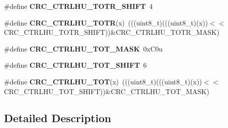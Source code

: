 \begin{DoxyCompactItemize}
\item 
\#define {\bfseries C\+R\+C\+\_\+\+C\+T\+R\+L\+H\+U\+\_\+\+T\+O\+T\+R\+\_\+\+S\+H\+I\+FT}~4\hypertarget{group__CRC__Register__Masks_ga991fefda83335d188d0cc82f1e64f43e}{}\label{group__CRC__Register__Masks_ga991fefda83335d188d0cc82f1e64f43e}

\item 
\#define {\bfseries C\+R\+C\+\_\+\+C\+T\+R\+L\+H\+U\+\_\+\+T\+O\+TR}(x)~(((uint8\+\_\+t)(((uint8\+\_\+t)(x))$<$$<$C\+R\+C\+\_\+\+C\+T\+R\+L\+H\+U\+\_\+\+T\+O\+T\+R\+\_\+\+S\+H\+I\+FT))\&C\+R\+C\+\_\+\+C\+T\+R\+L\+H\+U\+\_\+\+T\+O\+T\+R\+\_\+\+M\+A\+SK)\hypertarget{group__CRC__Register__Masks_ga93d5a2251369091d34c8cca12d716c2b}{}\label{group__CRC__Register__Masks_ga93d5a2251369091d34c8cca12d716c2b}

\item 
\#define {\bfseries C\+R\+C\+\_\+\+C\+T\+R\+L\+H\+U\+\_\+\+T\+O\+T\+\_\+\+M\+A\+SK}~0x\+C0u\hypertarget{group__CRC__Register__Masks_gac2999b1c162cd0860f76f002ead704ad}{}\label{group__CRC__Register__Masks_gac2999b1c162cd0860f76f002ead704ad}

\item 
\#define {\bfseries C\+R\+C\+\_\+\+C\+T\+R\+L\+H\+U\+\_\+\+T\+O\+T\+\_\+\+S\+H\+I\+FT}~6\hypertarget{group__CRC__Register__Masks_ga079a05fc69d357e3fadfb07de8abbeee}{}\label{group__CRC__Register__Masks_ga079a05fc69d357e3fadfb07de8abbeee}

\item 
\#define {\bfseries C\+R\+C\+\_\+\+C\+T\+R\+L\+H\+U\+\_\+\+T\+OT}(x)~(((uint8\+\_\+t)(((uint8\+\_\+t)(x))$<$$<$C\+R\+C\+\_\+\+C\+T\+R\+L\+H\+U\+\_\+\+T\+O\+T\+\_\+\+S\+H\+I\+FT))\&C\+R\+C\+\_\+\+C\+T\+R\+L\+H\+U\+\_\+\+T\+O\+T\+\_\+\+M\+A\+SK)\hypertarget{group__CRC__Register__Masks_ga190812e0be1bc09b3f29bf3c139140ad}{}\label{group__CRC__Register__Masks_ga190812e0be1bc09b3f29bf3c139140ad}

\end{DoxyCompactItemize}


\subsection{Detailed Description}
